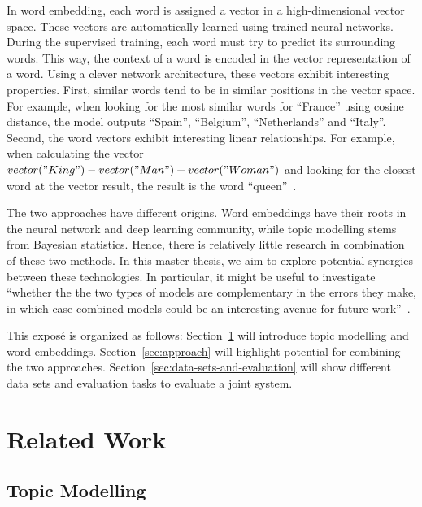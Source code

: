 \documentclass{sig-alternate-05-2015}
\begin{document}
In word embedding, each word is assigned a vector in a high-dimensional vector space.
These vectors are automatically learned using trained neural networks.
During the supervised training, each word must try to predict its surrounding words.
This way, the context of a word is encoded in the vector representation of a word.
Using a clever network architecture, these vectors exhibit interesting properties.
First, similar words tend to be in similar positions in the vector space.
For example, when looking for the most similar words for ``France'' using cosine distance, the model outputs ``Spain'', ``Belgium'', ``Netherlands'' and ``Italy''.
Second, the word vectors exhibit interesting linear relationships.
For example, when calculating the vector $vector("King") - vector("Man") + vector("Woman")$ and looking for the closest word at the vector result, the result is the word ``queen''~\cite{Mikolov2013b}.

The two approaches have different origins.
Word embeddings have their roots in the neural network and deep learning community, while topic modelling stems from Bayesian statistics.
Hence, there is relatively little research in combination of these two methods.
In this master thesis, we aim to explore potential synergies between these technologies.
In particular, it might be useful to investigate ``whether the the two types of models are complementary in the errors they make, in which case combined models could be an interesting avenue for future work''~\cite{Baroni2014}.

This expos\'e is organized as follows: Section~\ref{sec:related-work} will introduce topic modelling and word embeddings.
Section~\ref{sec:approach} will highlight potential for combining the two approaches.
Section~\ref{sec:data-sets-and-evaluation} will show different data sets and evaluation tasks to evaluate a joint system.

\section{Related Work}
\label{sec:related-work}
\subsection{Topic Modelling}
\end{document}
